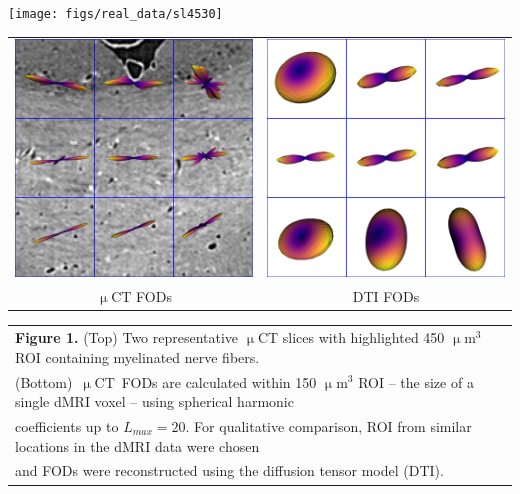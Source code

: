 \documentclass[landscape,a0paper,fontscale=0.36]{baposter} %
\begin{document}
\begin{poster}
{\begin{multicols}{2}
    \begin{center}
      \texttt{[image: figs/real\_data/sl4530]}\\[3pt]
      \begin{tabular}{c c}
        \includegraphics[width=0.4\linewidth]{figs/real_data/CC3} & \includegraphics[width=0.4\linewidth]{figs/real_data/CC3_DTI}\\
        $\upmu$CT FODs & DTI FODs
      \end{tabular}
    \end{center}

    \columnbreak
    
    
  \end{multicols}

  \vspace{0.5em}

  \begin{center}
  \begin{tabular}{l}
    \textbf{Figure 1.} (Top) Two representative $\upmu$CT slices with highlighted 450
    $\upmu$m$^3$ ROI containing myelinated nerve fibers. \\
    (Bottom)~$\upmu$CT~FODs are calculated within 150 $\upmu$m$^3$ ROI -- the size of a single dMRI
    voxel -- using spherical harmonic \\
    coefficients up to $L_{max}=20$. For qualitative comparison, ROI from similar locations in the dMRI data were chosen \\
    and FODs were reconstructed using the diffusion tensor model (DTI).\\
  \end{tabular}
  \end{center}
}
\setlength{\columnsep}{1.5em}


\end{poster}
\end{document}
